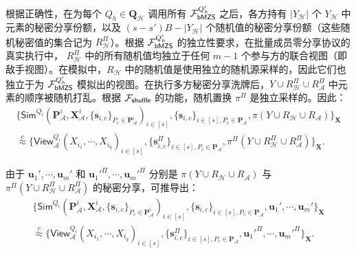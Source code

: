 \begin{trivlist}
根据正确性，在为每个 $Q_h \in \textbf{Q}_{\mathcal{H}}$ 调用所有 $\mathcal{F}_\mathsf{bMZS}^{Q'_h}$ 之后，各方持有 $\lvert Y_{\mathcal{H}} \rvert$ 个 $Y_{\mathcal{H}}$ 中元素的秘密分享份额，以及 $(s-s')B-\lvert Y_{\mathcal{H}} \rvert$ 个随机值的秘密分享份额（这些随机秘密值的集合记为 $R^\Pi_{\mathcal{H}}$）。根据 $\mathcal{F}_\mathsf{bMZS}^{Q'_h}$ 的独立性要求，在批量成员零分享协议的真实执行中， $R^\Pi_{\mathcal{H}}$ 中的所有随机值均独立于任何 $m-1$ 个参与方的联合视图（即敌手视图）。在模拟中，$R_{\mathcal{H}}$ 中的随机值是使用独立的随机源采样的，因此它们也独立于为 $\mathcal{F}_\mathsf{bMZS}^{Q'_h}$ 模拟出的视图。在执行多方秘密分享洗牌后，$Y \cup R^\Pi_{\mathcal{H}} \cup R^\Pi_{\mathcal{A}}$ 中元素的顺序被随机打乱。根据 $\mathcal{F}_\mathsf{shuffle}$ 的功能，随机置换 $\pi^\Pi$ 是独立采样的。因此：
\begin{gather*}
\{\mathsf{Sim}^{Q_i}(\textbf{P}^i_{\mathcal{A}},\textbf{X}^i_{\mathcal{A}},\{\textbf{s}_{i, c}\}_{P_c \in \textbf{P}^i_{\mathcal{A}}})_{i \in [s]}, \{\textbf{s}_{i, c}\}_{i \in [s], P_c \in \textbf{P}_{\mathcal{A}}}, \pi(Y \cup R_{\mathcal{H}} \cup R_{\mathcal{A}})\}_\textbf{X} \\
\overset{c}{\approx} \{\mathsf{View}_{\mathcal{A}}^{Q_i}(X_{i_1},\cdots,X_{i_q})_{i \in [s]}, \{\textbf{s}^{\Pi}_{i, c}\}_{i \in [s], P_c \in \textbf{P}_{\mathcal{A}}}, \pi^\Pi(Y \cup R^\Pi_{\mathcal{H}} \cup R^\Pi_{\mathcal{A}})\}_\textbf{X}.
\end{gather*}

由于 $\textbf{u}_{1}', \cdots,\textbf{u}_{m}'$ 和 $\textbf{u}_{1}'^{\Pi}, \cdots,\textbf{u}_{m}'^{\Pi}$ 分别是 $\pi(Y \cup R_{\mathcal{H}} \cup R_{\mathcal{A}})$ 与 $\pi^\Pi(Y \cup R^\Pi_{\mathcal{H}} \cup R^\Pi_{\mathcal{A}})$ 的秘密分享，可推导出：
\begin{gather*}
\{\mathsf{Sim}^{Q_i}(\textbf{P}^i_{\mathcal{A}},\textbf{X}^i_{\mathcal{A}},\{\textbf{s}_{i, c}\}_{P_c \in \textbf{P}^i_{\mathcal{A}}})_{i \in [s]}, \{\textbf{s}_{i, c}\}_{i \in [s], P_c \in \textbf{P}_{\mathcal{A}}}, \textbf{u}_{1}', \cdots,\textbf{u}_{m}'\}_\textbf{X} \\
\overset{c}{\approx} \{\mathsf{View}_{\mathcal{A}}^{Q_i}(X_{i_1},\cdots,X_{i_q})_{i \in [s]},\{\textbf{s}^{\Pi}_{i, c}\}_{i \in [s], P_c \in \textbf{P}_{\mathcal{A}}}, \textbf{u}_{1}'^{\Pi}, \cdots,\textbf{u}_{m}'^{\Pi}\}_\textbf{X}.
\end{gather*}


\end{trivlist}
